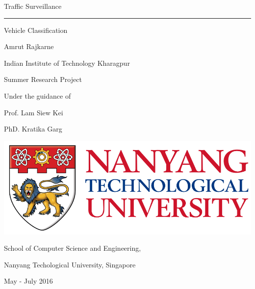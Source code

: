 \documentclass[a4paper,12pt]{article}
\begin{document}
	
	\begin{titlepage}
		\begin{center}
			\vspace*{1in}
			{\huge Traffic Surveillance}
			\vspace{0.1in}
			\hrule
			\vspace{0.1in}
			\par
			{\large Vehicle Classification}
			\par
			\vspace{1.5in}
			{\Large Amrut Rajkarne}
			\par
			\vspace{0.02in}
			{\normalsize Indian Institute of Technology Kharagpur}
			\par
			\vspace{0.5in}
			{\large Summer Research Project}
			\par
			\vspace{0.5in}
			Under the guidance of
			\par
			Prof. Lam Siew Kei
			\par
			PhD. Kratika Garg
			\par
			\vspace{0.25in}
			\graphicspath{ {/home/n1502414k/Traffic_Surveillance/My_Project/} }
			\includegraphics[scale= 0.125]{NTULogo}
			\vspace{0.15in}
			\par
			School of Computer Science and Engineering,
			\par
			Nanyang Techological University, Singapore
			\par
			\vspace{0.5in}
			May - July 2016
		\end{center}
	\end{titlepage}
	
	
\end{document}

